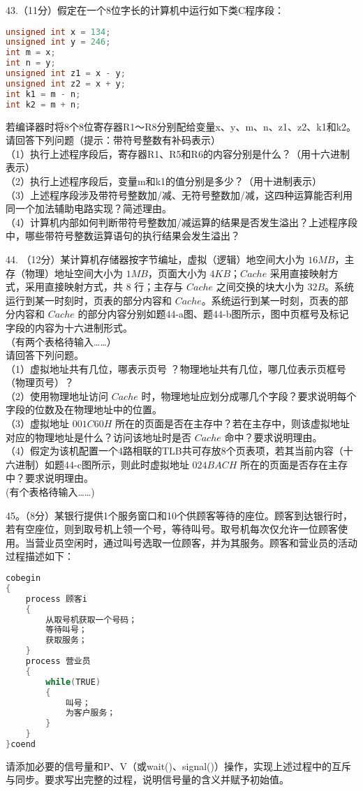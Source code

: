 43.（11分）假定在一个8位字长的计算机中运行如下类C程序段：
\begin{lstlisting}[language=cpp]
unsigned int x = 134;
unsigned int y = 246;
int m = x;
int n = y;
unsigned int z1 = x - y;
unsigned int z2 = x + y;
int k1 = m - n;
int k2 = m + n;
\end{lstlisting}
若编译器时将8个8位寄存器R1～R8分别配给变量x、y、m、n、z1、z2、k1和k2。请回答下列问题（提示：带符号整数有补码表示） \\
（1）执行上述程序段后，寄存器R1、R5和R6的内容分别是什么？（用十六进制表示） \\
（2）执行上述程序段后，变量m和k1的值分别是多少？（用十进制表示）  \\
（3）上述程序段涉及带符号整数加/减、无符号整数加/减，这四种运算能否利用同一个加法辅助电路实现？简述理由。 \\
（4）计算机内部如何判断带符号整数加/减运算的结果是否发生溢出？上述程序段中，哪些带符号整数运算语句的执行结果会发生溢出？

44. （12分）某计算机存储器按字节编址，虚拟（逻辑）地空间大小为 $16MB$，主存（物理）地址空间大小为 $1MB$，页面大小为 $4KB$；$Cache$ 采用直接映射方式，采用直接映射方式，共 $8$ 行；主存与 $Cache$ 之间交换的块大小为 $32B$。系统运行到某一时刻时，页表的部分内容和 $Cache$。系统运行到某一时刻，页表的部分内容和 $Cache$ 的部分内容分别如题44-a图、题44-b图所示，图中页框号及标记字段的内容为十六进制形式。  \\
（有两个表格待输入……） \\
请回答下列问题。 \\
（1）虚拟地址共有几位，哪表示页号 ？物理地址共有几位，哪几位表示页框号（物理页号）？ \\
（2）使用物理地址访问 $Cache$ 时，物理地址应划分成哪几个字段？要求说明每个字段的位数及在物理地址中的位置。 \\
（3）虚拟地址 $001C60H$ 所在的页面是否在主存中？若在主存中，则该虚拟地址对应的物理地址是什么？访问该地址时是否 $Cache$ 命中？要求说明理由。 \\
（4）假定为该机配置一个4路相联的TLB共可存放8个页表项，若其当前内容（十六进制）如题44-c图所示，则此时虚拟地址 $024BACH$ 所在的页面是否存在主存中？要求说明理由。 \\
(有个表格待输入……)

45。（8分）某银行提供1个服务窗口和10个供顾客等待的座位。顾客到达银行时，若有空座位，则到取号机上领一个号，等待叫号。取号机每次仅允许一位顾客使用。当营业员空闲时，通过叫号选取一位顾客，并为其服务。顾客和营业员的活动过程描述如下：
\begin{lstlisting}[language=cpp]
cobegin
{
    process 顾客i
    {
        从取号机获取一个号码；
        等待叫号；
        获取服务；
    }
    process 营业员
    {
        while(TRUE)
        {
            叫号；
            为客户服务； 
        }
    }
}coend
\end{lstlisting}
请添加必要的信号量和P、V（或wait()、signal()）操作，实现上述过程中的互斥与同步。要求写出完整的过程，说明信号量的含义并赋予初始值。

